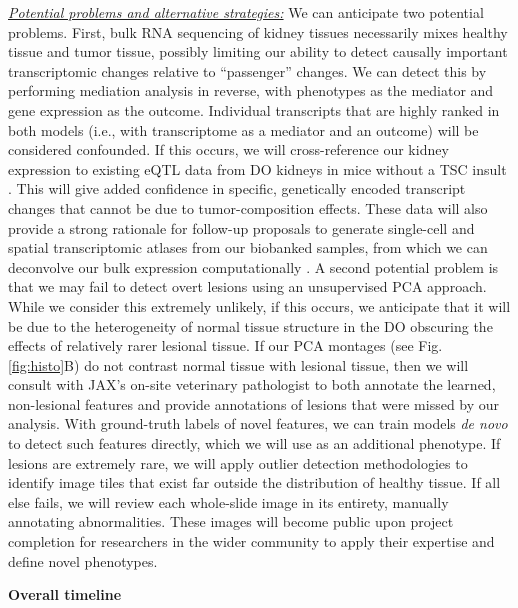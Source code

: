 \documentclass[
  12pt,
]{article}
\begin{document}
\textit{\underline{Potential problems and alternative strategies:}} We
can anticipate two potential problems. First, bulk RNA sequencing of
kidney tissues necessarily mixes healthy tissue and tumor tissue,
possibly limiting our ability to detect causally important
transcriptomic changes relative to ``passenger'' changes. We can detect
this by performing mediation analysis in reverse, with phenotypes as the
mediator and gene expression as the outcome. Individual transcripts that
are highly ranked in both models (i.e., with transcriptome as a mediator
and an outcome) will be considered confounded. If this occurs, we will
cross-reference our kidney expression to existing eQTL data from DO
kidneys in mice without a TSC insult \cite{33687326}. This will give
added confidence in specific, genetically encoded transcript changes
that cannot be due to tumor-composition effects. These data will also
provide a strong rationale for follow-up proposals to generate
single-cell and spatial transcriptomic atlases from our biobanked
samples, from which we can deconvolve our bulk expression
computationally \cite{30670690}. A second potential problem is that we
may fail to detect overt lesions using an unsupervised PCA approach.
While we consider this extremely unlikely, if this occurs, we anticipate
that it will be due to the heterogeneity of normal tissue structure in
the DO obscuring the effects of relatively rarer lesional tissue. If our
PCA montages (see Fig. \ref{fig:histo}B) do not contrast normal tissue
with lesional tissue, then we will consult with JAX's on-site veterinary
pathologist to both annotate the learned, non-lesional features and
provide annotations of lesions that were missed by our analysis. With
ground-truth labels of novel features, we can train models
\textit{de novo} to detect such features directly, which we will use as
an additional phenotype. If lesions are extremely rare, we will apply
outlier detection methodologies \cite{crammer_needle_2004} to identify
image tiles that exist far outside the distribution of healthy tissue.
If all else fails, we will review each whole-slide image in its
entirety, manually annotating abnormalities. These images will become
public upon project completion for researchers in the wider community to
apply their expertise and define novel phenotypes.

\textbf{Overall timeline}
\end{document}

